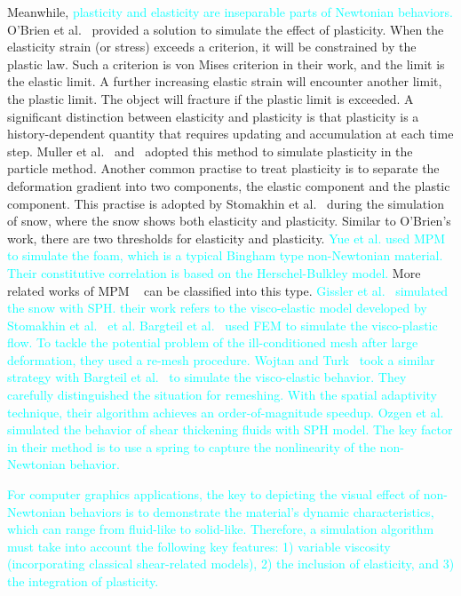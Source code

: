 \documentclass[10pt,journal,compsoc]{IEEEtran}
\newcommand{\revised}[1]{{\textcolor{cyan}{#1}}}
\begin{document}
Meanwhile, \revised{plasticity and elasticity are inseparable parts of Newtonian behaviors.} O'Brien et al.~\cite {OBrien2002} provided a solution to simulate the effect of plasticity. When the elasticity strain (or stress) exceeds a criterion, it will be constrained by the plastic law. Such a criterion is von Mises criterion in their work, and the limit is the elastic limit. A further increasing elastic strain will encounter another limit, the plastic limit. The object will fracture if the plastic limit is exceeded. A significant distinction between elasticity and plasticity is that plasticity is a history-dependent quantity that requires updating and accumulation at each time step. Muller et al.~\cite{Muller2004-elastic-plastic-melting} and~\cite{Solenthaler2007} adopted this method to simulate plasticity in the particle method. Another common practise to treat plasticity is to separate the deformation gradient into two components, the elastic component and the plastic component. This practise is adopted by Stomakhin et al.~\cite{Stomakhin2013-snow} during the simulation of snow, where the snow shows both elasticity and plasticity. Similar to O'Brien's work, there are two thresholds for elasticity and plasticity. \revised{Yue et al.\cite{Yue2015} used MPM to simulate the foam, which is a typical Bingham type non-Newtonian material. Their constitutive correlation is based on the Herschel-Bulkley model.} More related works of MPM ~\cite{Su2021,gao2019efficient,Fang2019-sillyRubber,Gao2018-GPU-MPM} can be classified into this type. \revised{Gissler et al.~\cite{Gissler2020-snow} simulated the snow with SPH. their work refers to the visco-elastic model developed by Stomakhin et al.~\cite{Stomakhin2014} et al.} \revised{Bargteil et al.~\cite{Bargteil-2007-AFE} used FEM to simulate the visco-plastic flow. To tackle the potential problem of the ill-conditioned mesh after large deformation, they used a re-mesh procedure.} \revised{Wojtan and Turk~\cite{Wojtan2008} took a similar strategy with Bargteil et al.~\cite{Bargteil-2007-AFE} to simulate the visco-elastic behavior. They carefully distinguished the situation for remeshing. With the spatial adaptivity technique, their algorithm achieves an order-of-magnitude speedup.} \revised{Ozgen et al.~\cite{Ozgen2019} simulated the behavior of shear thickening fluids with SPH model. The key factor in their method is to use a spring to capture the nonlinearity of the non-Newtonian behavior.}


\revised{For computer graphics applications, the key to depicting the visual effect of non-Newtonian behaviors is to demonstrate the material’s dynamic characteristics, which can range from fluid-like to solid-like. Therefore, a simulation algorithm must take into account the following key features: 1) variable viscosity (incorporating classical shear-related models), 2) the inclusion of elasticity, and 3) the integration of plasticity.}
\end{document}
